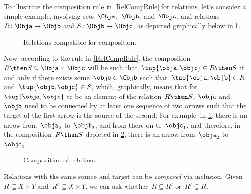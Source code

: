 To illustrate the composition rule in \cref{RelCompRule} for relations, let's consider a simple example, involving sets~$\Obja$,~$\Objb$, and~$\Objc$, and relations~$R \colon \Obja \to \Objb$ and $S \colon \Objb \to \Objc$, as depicted graphically below in \cref{fig:example_rel_composable}.
\begin{figure}[h!]
  \centering
  \caption{Relations compatible for composition.}
  \label{fig:example_rel_composable}
\end{figure}
Now, according to the rule in \cref{RelCompRule}, the composition~$R \then S \subseteq \Obja \times \Objc$ will be such that~$\tup{\obja,\objc} \in R \then S$ if and only if there exists some~$\objb \in \Objb$ such that~$\tup{\obja,\objb} \in R$ and~$\tup{\objb,\objc} \in S$, which, graphically, means that for~$\tup{\obja,\objc}$ to be an element of the relation~$R \then S$,~$\obja$ and~$\objb$ need to be connected by at least one sequence of two arrows such that the target of the first arrow is the source of the second. For example, in \cref{fig:example_rel_composable}, there is an arrow from~$\obja_2$ to~$\objb_3$, and from there on to~$\objc_1$, and therefore, in the composition~$R \then S$ depicted in \cref{fig:example_rel_composed}, there is an arrow from~$\obja_2$ to~$\objc_1$.
\begin{figure}[h!]
  \centering
  \caption{Composition of relations.}
  \label{fig:example_rel_composed}
\end{figure}

\begin{remark}
  Relations with the same source and target can be \emph{compared} via inclusion. Given~$R\subseteq X\times Y$ and~$R'\subseteq X\times Y$, we can ask whether~$R\subseteq R'$ or~$R'\subseteq R$.
\end{remark}
